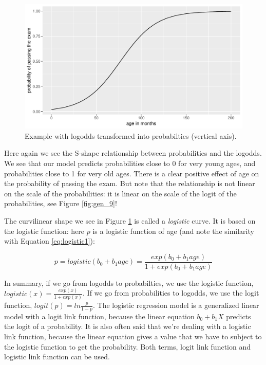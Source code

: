 \documentclass[]{report}\usepackage[]{graphicx}\usepackage[]{color}
\makeatletter
\def\maxwidth{ %
  \ifdim\Gin@nat@width>\linewidth
    \linewidth
  \else
    \Gin@nat@width
  \fi
}
\newenvironment{knitrout}{}{} %
\makeatother
\begin{document}
\begin{knitrout}
\color{fgcolor}\begin{figure}

{\centering \includegraphics[width=\maxwidth]{figure/gen_10-1} 

}

\caption[Example with logodds transformed into probabilties (vertical axis)]{Example with logodds transformed into probabilties (vertical axis).}\label{fig:gen_10}
\end{figure}


\end{knitrout}

Here again we see the S-shape relationship between probabilities and the logodds. We see that our model predicts probabilities close to 0 for very young ages, and probabilities close to 1 for very old ages. There is a clear positive effect of age on the probability of passing the exam. But note that the relationship is not linear on the scale of the probabilities: it is linear on the scale of the logit of the probabilities, see Figure \ref{fig:gen_9}!

The curvilinear shape we see in Figure \ref{fig:gen_10} is called a \textit{logistic} curve. It is based on the logistic function: here $p$ is a logistic function of age (and note the similarity with Equation \ref{eq:logistic1}):


\begin{equation}
p = logistic(b_0 + b_1 age) = \frac{exp(b_0 + b_1 age)}{1+exp(b_0+ b_1 age)} \nonumber
\end{equation}

In summary, if we go from logodds to probabilties, we use the logistic function, $logistic(x)=\frac{exp(x)}{1+exp(x)}$. If we go from probabilities to logodds, we use the logit function, $logit(p)=ln\frac{p}{1-p}$. The logistic regression model is a generalized linear model with a logit link function, because the linear equation $b_0 + b_1 X$ predicts the logit of a probability. It is also often said that we're dealing with a logistic link function, because the linear equation gives a value that we have to subject to the logistic function to get the probability. Both terms, logit link function and logistic link function can be used.
\end{document}
